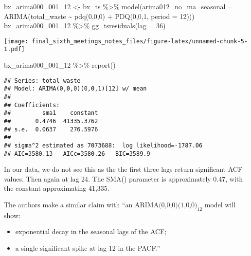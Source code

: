 \documentclass[
]{article}
\newenvironment{Shaded}{\begin{snugshade}}{\end{snugshade}}
\newcommand{\AttributeTok}[1]{\textcolor[rgb]{0.77,0.63,0.00}{#1}}
\newcommand{\DecValTok}[1]{\textcolor[rgb]{0.00,0.00,0.81}{#1}}
\newcommand{\FunctionTok}[1]{\textcolor[rgb]{0.00,0.00,0.00}{#1}}
\newcommand{\NormalTok}[1]{#1}
\newcommand{\OtherTok}[1]{\textcolor[rgb]{0.56,0.35,0.01}{#1}}
\newcommand{\SpecialCharTok}[1]{\textcolor[rgb]{0.00,0.00,0.00}{#1}}
\providecommand{\tightlist}{%
  \setlength{\itemsep}{0pt}\setlength{\parskip}{0pt}}
\begin{document}
\begin{Shaded}
\begin{Highlighting}[]
\NormalTok{bx\_arima000\_001\_12 }\OtherTok{\textless{}{-}}\NormalTok{ bx\_ts }\SpecialCharTok{\%\textgreater{}\%} \FunctionTok{model}\NormalTok{(}\AttributeTok{arima012\_no\_ma\_seasonal =} \FunctionTok{ARIMA}\NormalTok{(total\_waste }\SpecialCharTok{\textasciitilde{}} \FunctionTok{pdq}\NormalTok{(}\DecValTok{0}\NormalTok{,}\DecValTok{0}\NormalTok{,}\DecValTok{0}\NormalTok{) }\SpecialCharTok{+} \FunctionTok{PDQ}\NormalTok{(}\DecValTok{0}\NormalTok{,}\DecValTok{0}\NormalTok{,}\DecValTok{1}\NormalTok{, }\AttributeTok{period =} \DecValTok{12}\NormalTok{))) }
\NormalTok{bx\_arima000\_001\_12 }\SpecialCharTok{\%\textgreater{}\%} \FunctionTok{gg\_tsresiduals}\NormalTok{(}\AttributeTok{lag =} \DecValTok{36}\NormalTok{)}
\end{Highlighting}
\end{Shaded}

\texttt{[image: final\_sixth\_meetings\_notes\_files/figure-latex/unnamed-chunk-5-1.pdf]}

\begin{Shaded}
\begin{Highlighting}[]
\NormalTok{bx\_arima000\_001\_12 }\SpecialCharTok{\%\textgreater{}\%} \FunctionTok{report}\NormalTok{()}
\end{Highlighting}
\end{Shaded}

\begin{verbatim}
## Series: total_waste 
## Model: ARIMA(0,0,0)(0,0,1)[12] w/ mean 
## 
## Coefficients:
##         sma1    constant
##       0.4746  41335.3762
## s.e.  0.0637    276.5976
## 
## sigma^2 estimated as 7073688:  log likelihood=-1787.06
## AIC=3580.13   AICc=3580.26   BIC=3589.9
\end{verbatim}

In our data, we do not see this as the the first three lags return
significant ACF values. Then again at lag 24. The SMA() parameter is
approximately 0.47, with the constant approximating 41,335.

The authors make a similar claim with ``an
\(\text{ARIMA(0,0,0)(1,0,0)}_{12}\) model will show:

\begin{itemize}
\tightlist
\item
  exponential decay in the seasonal lags of the ACF;
\item
  a single significant spike at lag 12 in the PACF.''
\end{itemize}
\end{document}
